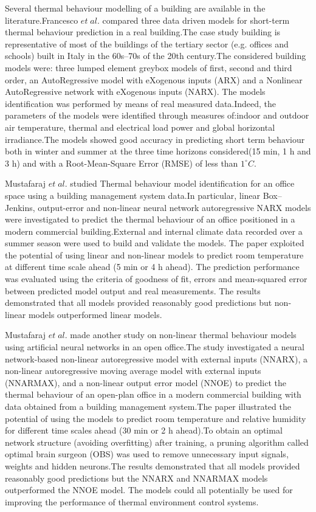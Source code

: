 \documentclass[a4paper,12pt]{report}
\numberwithin{equation}{section}
\begin{document}
Several thermal behaviour modelling of a building are available in the literature.Francesco $et\; al.$  compared  three data driven models for short-term thermal behaviour prediction in a real building.The case study building is representative of most of the buildings of the tertiary sector (e.g. offices and schools) built in Italy in the 60s–70s of the 20th century.The considered building models were: three lumped element greybox models of first, second and third order, an AutoRegressive model with eXogenous inputs (ARX) and a Nonlinear AutoRegressive network with eXogenous inputs (NARX). The models identification was performed by means of real measured data.Indeed, the parameters of the models were identified through measures of:indoor and outdoor air temperature, thermal and electrical load power and global horizontal irradiance.The models showed good accuracy in predicting short term behaviour both in winter and summer at the three time horizons considered(15 min, 1 h and 3 h) and with a Root-Mean-Square Error (RMSE) of less than $1^{\circ} C$.

Mustafaraj $et\; al.$ studied Thermal behaviour model identification for an office space
using a building management system data.In particular, linear Box–Jenkins, output-error and non-linear neural network autoregressive NARX models were investigated to predict the thermal behaviour of an office positioned in a modern commercial building.External and internal climate data recorded over a summer season were used to build and validate the models. The paper exploited the potential of using linear and non-linear models to predict room temperature at different time scale ahead (5 min or 4 h ahead). The prediction performance was evaluated using the criteria of goodness of fit, errors and mean-squared error between predicted model output and real measurements. The results demonstrated that all models provided reasonably good predictions but non-linear models outperformed linear models.

Mustafaraj $et\; al.$ made another study on non-linear thermal behaviour models using artificial neural networks in  an open office.The study investigated a neural network-based non-linear autoregressive model with external inputs (NNARX), a non-linear autoregressive moving average model with external inputs (NNARMAX), and a non-linear output error model (NNOE) to predict the thermal behaviour of an open-plan office in a modern commercial building with data obtained from a building management system.The paper illustrated the potential of using the models to predict
room temperature and relative humidity for different time scales ahead (30 min or 2 h
ahead).To obtain an optimal network structure (avoiding overfitting) after training, a pruning algorithm called optimal brain surgeon (OBS) was used to remove unnecessary input signals, weights and hidden neurons.The results demonstrated that all models provided reasonably good predictions but the NNARX and NNARMAX models outperformed the NNOE model. The models could all potentially be used for improving the performance of thermal environment control systems.
\end{document}
